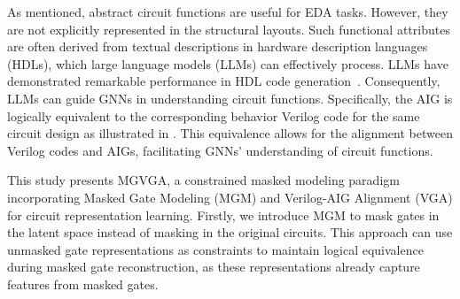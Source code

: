 As mentioned, abstract circuit functions are useful for EDA tasks.
However, they are not explicitly represented in the structural layouts. 
Such functional attributes are often derived from textual descriptions in hardware description languages (HDLs), which large language models (LLMs) can effectively process.
LLMs have demonstrated remarkable performance in HDL code generation~\cite{pei2024betterv, tsai2024rtlfixer, fang2024assertllm,liu2023rtlcoder}.
Consequently, LLMs can guide GNNs in understanding circuit functions. 
Specifically, the AIG is logically equivalent to the corresponding behavior Verilog code for the same circuit design as illustrated in .
This equivalence allows for the alignment between Verilog codes and AIGs, facilitating GNNs' understanding of circuit functions.

This study presents MGVGA, a constrained masked modeling paradigm incorporating Masked Gate Modeling (MGM) and Verilog-AIG Alignment (VGA) for circuit representation learning. 
Firstly, we introduce MGM to mask gates in the latent space instead of masking in the original circuits.
This approach can use unmasked gate representations as constraints to maintain logical equivalence during masked gate reconstruction, as these representations already capture features from masked gates. 
